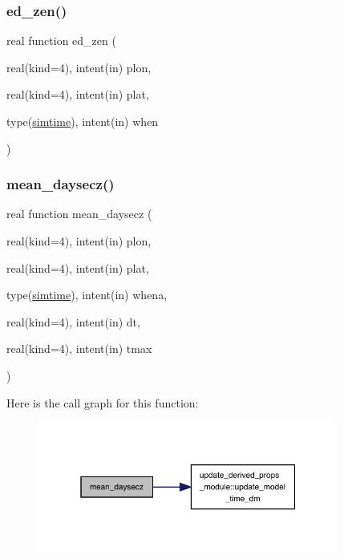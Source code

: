 \subsubsection{\texorpdfstring{ed\+\_\+zen()}{ed\_zen()}}
{\footnotesize\ttfamily real function ed\+\_\+zen (\begin{DoxyParamCaption}\item[{real(kind=4), intent(in)}]{plon,  }\item[{real(kind=4), intent(in)}]{plat,  }\item[{type(\hyperlink{structed__misc__coms_1_1simtime}{simtime}), intent(in)}]{when }\end{DoxyParamCaption})}

\mbox{\label{radiate__driver_8f90_a43ec6176af1ff5ea603858cec577ff95}} 
\subsubsection{\texorpdfstring{mean\+\_\+daysecz()}{mean\_daysecz()}}
{\footnotesize\ttfamily real function mean\+\_\+daysecz (\begin{DoxyParamCaption}\item[{real(kind=4), intent(in)}]{plon,  }\item[{real(kind=4), intent(in)}]{plat,  }\item[{type(\hyperlink{structed__misc__coms_1_1simtime}{simtime}), intent(in)}]{whena,  }\item[{real(kind=4), intent(in)}]{dt,  }\item[{real(kind=4), intent(in)}]{tmax }\end{DoxyParamCaption})}

Here is the call graph for this function\+:
\nopagebreak
\begin{figure}[H]
\begin{center}
\leavevmode
\includegraphics[width=280pt]{radiate__driver_8f90_a43ec6176af1ff5ea603858cec577ff95_cgraph}
\end{center}
\end{figure}
